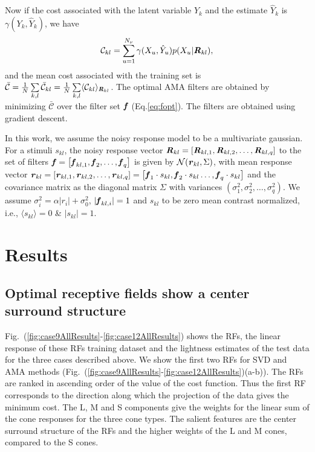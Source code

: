 \documentclass{jov}
\begin{document}
Now if the cost associated with the latent variable $Y_k$ and the estimate $\hat{Y}_k$ is $\gamma (Y_k,\hat{Y}_k)$, we have  
\begin{align}
\mathcal{C}_{kl} = \sum\limits_{u=1}^{N_{\nu}}\gamma(X_u,\hat{Y}_u)p(X_u|{\textbf{\textit R}}_{kl}),
\end{align}
and the mean cost associated with the training set is $\bar{\mathcal{C}} = \frac{1}{N} \sum\limits_{k,l}\bar{\mathcal{C}}_{kl} = \frac{1}{N} \sum\limits_{k,l}\langle \mathcal{C}_{kl}\rangle_{{\textbf{\textit R}}_{kl}}$. The optimal AMA filters are obtained by minimizing $\bar{\mathcal{C}}$ over the filter set ${\textbf {\textit f} }$ (Eq.\ref{eq:fopt}). The filters are obtained using gradient descent.

In this work, we assume the noisy response model to be a multivariate gaussian. For a stimuli $s_{kl}$, the noisy response vector ${\textbf{\textit R}}_{kl} = \left[{\textbf{\textit R}}_{kl,1},{\textbf{\textit R}}_{kl,2},\dots,{\textbf{\textit R}}_{kl,q}\right]$ to the set of filters ${\textbf{\textit f}} = \left[{\textbf{\textit f}}_{kl,1},{\textbf{\textit f}}_{2},\dots,{\textbf{\textit f}}_{q}\right]$ is given by $\mathcal{N}({\textbf{\textit r}}_{kl}, \Sigma)$, with mean response vector ${\textbf{\textit r}}_{kl} = \left[{\textbf{\textit r}}_{kl,1},{\textbf{\textit r}}_{kl,2},\dots,{\textbf{\textit r}}_{kl,q}\right] = \left[{\textbf{\textit f}}_{1}\cdot s_{kl},{\textbf{\textit f}}_{2}\cdot s_{kl}\dots,{\textbf{\textit f}}_{q}\cdot s_{kl}\right]$ and the covariance matrix as the diagonal matrix $\Sigma$ with variances $\left(\sigma_1^2, \sigma_2^2,\dots, \sigma_q^2 \right)$. We assume $\sigma_i^2 = \alpha |r_i| + \sigma_0^2$, $|{\textbf{\textit f}}_{kl,i}|=1$ and $s_{kl}$ to be zero mean contrast normalized, i.e., $\langle{s_{kl}}\rangle = 0$ \& ${|s_{kl}|=1}$.

\section{Results} \label{Results}
\subsection{Optimal receptive fields show a center surround structure}
Fig.~(\ref{fig:case9AllResults}-\ref{fig:case12AllResults}) shows the RFs, the linear response of these RFs training dataset and the lightness estimates of the test data for the three cases described above. We show the first two RFs for SVD and AMA methods (Fig.~(\ref{fig:case9AllResults}-\ref{fig:case12AllResults})(a-b)). The RFs are ranked in ascending order of the value of the cost function. Thus the first RF corresponds to the direction along which the projection of the data gives the minimum cost. The L, M and S components give the weights for the linear sum of the cone responses for the three cone types. The salient features are the center surround structure of the RFs and the higher weights of the L and M cones, compared to the S cones. 
\end{document}
